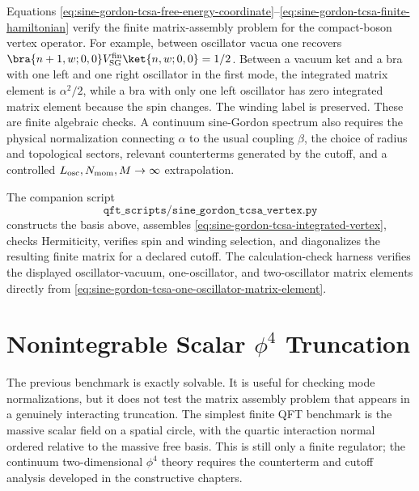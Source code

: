 \begin{remark}
\label{rem:sine-gordon-tcsa-vertex-assembly-scope}
Equations
\eqref{eq:sine-gordon-tcsa-free-energy-coordinate}--\eqref{eq:sine-gordon-tcsa-finite-hamiltonian}
verify the finite matrix-assembly problem for the compact-boson vertex
operator.  For example, between oscillator vacua one recovers
\(\bra{n+1,w;0,0}V_{\rm SG}^{\rm fin}\ket{n,w;0,0}=1/2\).  Between a
vacuum ket and a bra with one left and one right oscillator in the first
mode, the integrated matrix element is \(\alpha^2/2\), while a bra with only
one left oscillator has zero integrated matrix element because the spin
changes.  The winding label is preserved.  These are finite algebraic
checks.  A continuum sine-Gordon spectrum also requires the physical
normalization connecting \(\alpha\) to the usual coupling \(\beta\), the
choice of radius and topological sectors, relevant counterterms generated by
the cutoff, and a controlled \(L_{\rm osc},N_{\rm mom},M\to\infty\)
extrapolation.
\end{remark}

The companion script
\[
  \texttt{qft\_scripts/sine\_gordon\_tcsa\_vertex.py}
\]
constructs the basis above, assembles
\eqref{eq:sine-gordon-tcsa-integrated-vertex}, checks Hermiticity, verifies
spin and winding selection, and diagonalizes the resulting finite matrix for
a declared cutoff.  The calculation-check harness verifies the displayed
oscillator-vacuum, one-oscillator, and two-oscillator matrix elements
directly from \eqref{eq:sine-gordon-tcsa-one-oscillator-matrix-element}.

\section{\texorpdfstring{Nonintegrable Scalar \(\phi^4\) Truncation}{Nonintegrable Scalar phi4 Truncation}}
\label{sec:finite-phi4-hamiltonian-truncation-benchmark}

The previous benchmark is exactly solvable.  It is useful for checking mode
normalizations, but it does not test the matrix assembly problem that appears
in a genuinely interacting truncation.  The simplest finite QFT benchmark is
the massive scalar field on a spatial circle, with the quartic interaction
normal ordered relative to the massive free basis.  This is still only a
finite regulator; the continuum two-dimensional \(\phi^4\) theory requires
the counterterm and cutoff analysis developed in the constructive chapters.


